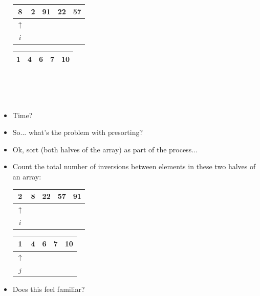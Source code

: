 \documentclass[12pt]{article}
\begin{document}
\begin{itemize}
    \begin{minipage}{0.5\textwidth}\centering
        \begin{tabular}{|*{5}{c|}}
        \hline
        8 & 2 & 91 & 22 & 57 \\
        \hline
        $\uparrow$ \\
        $i$
      \end{tabular}
    \end{minipage}%
    \begin{minipage}{0.5\textwidth}\centering
      \begin{tabular}{|*{5}{c|}}
        \hline
        1 & 4 & 6 & 7 & 10 \\
        \hline
       \end{tabular}
       \\~\\~
    \end{minipage}%
    \vspace{.25in}    
    
    \item Time?
    \vspace{.5in}    
    
    \item So... what's the problem with presorting? 
    \vspace{.5in}    
    
    \item Ok, sort (both halves of the array) as part of the process...

    \item Count the total number of inversions between elements in these two halves of an array:
    
    \begin{minipage}{0.5\textwidth}\centering
        \begin{tabular}{|*{5}{c|}}
            \hline
            2 & 8 & 22 & 57 & 91 \\
            \hline
            $\uparrow$ \\
            $i$
          \end{tabular}
        \end{minipage}%
        \begin{minipage}{0.5\textwidth}\centering
          \begin{tabular}{|*{5}{c|}}
            \hline
            1 & 4 & 6 & 7 & 10 \\
            \hline
            $\uparrow$ \\
            $j$
          \end{tabular}
        \end{minipage}%
        \vspace{1in}    
            
    \item Does this feel familiar?
    
\end{itemize}
\end{document}
